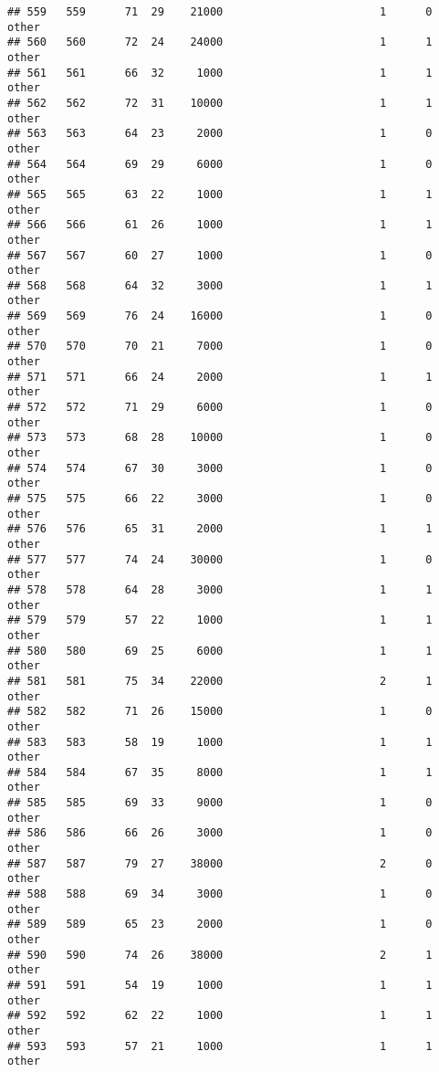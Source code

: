 \documentclass[
]{article}
\begin{document}
\begin{verbatim}
## 559   559      71  29    21000                        1      0    other
## 560   560      72  24    24000                        1      1    other
## 561   561      66  32     1000                        1      1    other
## 562   562      72  31    10000                        1      1    other
## 563   563      64  23     2000                        1      0    other
## 564   564      69  29     6000                        1      0    other
## 565   565      63  22     1000                        1      1    other
## 566   566      61  26     1000                        1      1    other
## 567   567      60  27     1000                        1      0    other
## 568   568      64  32     3000                        1      1    other
## 569   569      76  24    16000                        1      0    other
## 570   570      70  21     7000                        1      0    other
## 571   571      66  24     2000                        1      1    other
## 572   572      71  29     6000                        1      0    other
## 573   573      68  28    10000                        1      0    other
## 574   574      67  30     3000                        1      0    other
## 575   575      66  22     3000                        1      0    other
## 576   576      65  31     2000                        1      1    other
## 577   577      74  24    30000                        1      0    other
## 578   578      64  28     3000                        1      1    other
## 579   579      57  22     1000                        1      1    other
## 580   580      69  25     6000                        1      1    other
## 581   581      75  34    22000                        2      1    other
## 582   582      71  26    15000                        1      0    other
## 583   583      58  19     1000                        1      1    other
## 584   584      67  35     8000                        1      1    other
## 585   585      69  33     9000                        1      0    other
## 586   586      66  26     3000                        1      0    other
## 587   587      79  27    38000                        2      0    other
## 588   588      69  34     3000                        1      0    other
## 589   589      65  23     2000                        1      0    other
## 590   590      74  26    38000                        2      1    other
## 591   591      54  19     1000                        1      1    other
## 592   592      62  22     1000                        1      1    other
## 593   593      57  21     1000                        1      1    other

\end{verbatim}
\end{document}
